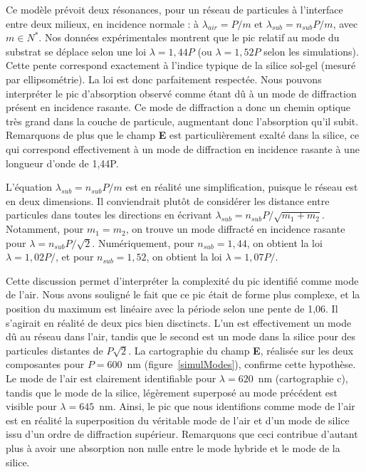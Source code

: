 Ce modèle prévoit deux résonances, pour un réseau de particules à l’interface entre deux milieux, en incidence normale : à $\lambda_{air} = P/m$ et $\lambda_{sub} = n_{sub}P/m$, avec $m \in N^*$. Nos données expérimentales montrent que le pic relatif au mode du substrat se déplace selon une loi $\lambda = 1,44P $ (ou $\lambda = 1, 52P$ selon les simulations). Cette pente correspond exactement à l'indice typique de la silice sol-gel (mesuré par ellipsométrie). La loi est donc parfaitement respectée. Nous pouvons interpréter le pic d'absorption observé comme étant dû à un mode de diffraction présent en incidence rasante. Ce mode de diffraction a donc un chemin optique très grand dans la couche de particule, augmentant donc l'absorption qu'il subit. Remarquons de plus que le champ \textbf{E} est particulièrement exalté dans la silice, ce qui correspond effectivement à un mode de diffraction en incidence rasante à une longueur d'onde de 1,44P.\par 
L'équation $\lambda_{sub} = n_{sub}P/m$ est en réalité une simplification, puisque le réseau est en deux dimensions. Il conviendrait plutôt de considérer les distance entre particules dans toutes les directions en écrivant $\lambda_{sub} = n_{sub}P/\sqrt{m_1+m_2}$. Notamment, pour $m_1=m_2$, on trouve un mode diffracté en incidence rasante pour $\lambda = n_{sub}P/\sqrt{2}$. Numériquement, pour $n_{sub}=1,44$, on obtient la loi $\lambda = 1,02 P/$, et pour $n_{sub}=1,52$, on obtient la loi $\lambda = 1,07 P/$.\par 
Cette discussion permet d'interpréter la complexité du pic identifié comme mode de l'air. Nous avons souligné le fait que ce pic était de forme plus complexe, et la position du maximum est linéaire avec la période selon une pente de 1,06. Il s'agirait en réalité de deux pics bien disctincts. L'un est effectivement un mode dû au réseau dans l'air, tandis que le second est un mode dans la silice pour des particules distantes de $P\sqrt{2}$. La cartographie du champ \textbf{E}, réalisée sur les deux composantes pour $P = 600$~nm (figure~\ref{simulModes}), confirme cette hypothèse. Le mode de l'air est clairement identifiable pour $\lambda = 620$~nm (cartographie c), tandis que le mode de la silice, légèrement superposé au mode précédent est visible pour $\lambda = 645$~nm. Ainsi, le pic que nous identifions comme \og mode de l'air \fg{} est en réalité la superposition du véritable mode de l'air et d'un mode de silice issu d'un ordre de diffraction supérieur. Remarquons que ceci contribue d'autant plus à avoir une absorption non nulle entre le mode hybride et le mode de la silice.\par 

